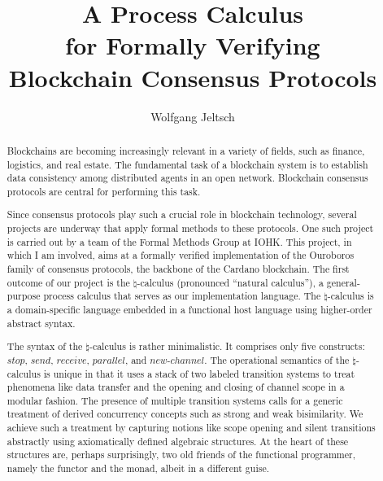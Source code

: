 \documentclass{llncs}
\begin{document}
\title{%
    A Process Calculus\\
    for Formally Verifying\\
    Blockchain Consensus Protocols%
}
\author{Wolfgang Jeltsch}
\maketitle

\begin{abstract}

Blockchains are becoming increasingly relevant in a variety of fields,
such as finance, logistics, and real estate. The fundamental task of a
blockchain system is to establish data consistency among distributed
agents in an open network. Blockchain consensus protocols are central
for performing this task.

Since consensus protocols play such a crucial role in blockchain
technology, several projects are underway that apply formal methods to
these protocols. One such project is carried out by a team of the Formal
Methods Group at IOHK. This project, in which I am involved, aims at a
formally verified implementation of the Ouroboros family of consensus
protocols, the backbone of the Cardano blockchain. The first outcome of
our project is the $\natural$-calculus (pronounced ``natural
calculus''), a general-purpose process calculus that serves as our
implementation language. The $\natural$-calculus is a domain-specific
language embedded in a functional host language using higher-order
abstract syntax.

The syntax of the $\natural$-calculus is rather minimalistic. It
comprises only five constructs: $\mathit{stop}$, $\mathit{send}$,
$\mathit{receive}$, $\mathit{parallel}$, and
$\mathit{new\text{-}channel}$. The operational semantics of the
$\natural$-calculus is unique in that it uses a stack of two labeled
transition systems to treat phenomena like data transfer and the opening
and closing of channel scope in a modular fashion. The presence of
multiple transition systems calls for a generic treatment of derived
concurrency concepts such as strong and weak bisimilarity. We achieve
such a treatment by capturing notions like scope opening and silent
transitions abstractly using axiomatically defined algebraic structures.
At the heart of these structures are, perhaps surprisingly, two old
friends of the functional programmer, namely the functor and the monad,
albeit in a different guise.


\end{abstract}
\end{document}
